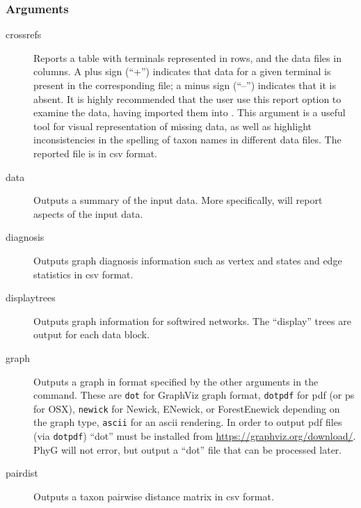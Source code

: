 	\subsubsection{Arguments}
	\begin{description}
		
		\item[crossrefs] Reports a table with terminals represented in rows, and the data files in 
		columns. A plus sign (``+'') indicates that data for a given terminal is present in the 
		corresponding file; a minus sign (``--'') indicates that it is absent. It is highly recommended 
		that the user use this report option to examine the data, having imported them into \phyg. 
		This argument is a useful tool for visual representation of missing data, as well as highlight 
		inconsistencies in the spelling of taxon names in different data files. The reported file is 
		in csv format.
			
		\item[data] Outputs a summary of the input data. More specifically, \phyg will report 
		aspects of the input data. 
	
		\item[diagnosis] Outputs graph diagnosis information such as vertex and states and edge 
		statistics in csv format. 
		
		\item[displaytrees] Outputs graph information for softwired networks. The ``display'' trees 
		are output for each data block. 
		
		\item[graph] Outputs a graph in format specified by the other arguments in the command. 
		These are \texttt{dot} for 
		GraphViz graph format, \texttt{dotpdf} for pdf (or ps for OSX), \texttt{newick} for Newick, 
		ENewick, or ForestEnewick depending on the graph type, \texttt{ascii} for an ascii rendering. 
		In order to output pdf files (via \texttt{dotpdf}) ``dot'' must be installed from 
		\url{https://graphviz.org/download/}. PhyG will not error, but output a ``dot'' file that 
		can be processed later.
		
		\item[pairdist] Outputs a taxon pairwise distance matrix in csv format. 
		

\end{description}
